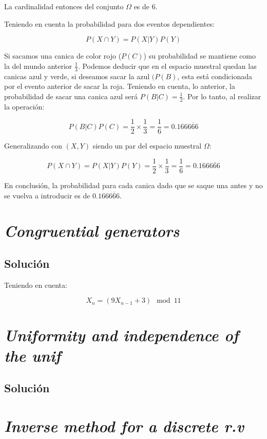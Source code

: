 \documentclass[12pt]{article}
\begin{document}
La cardinalidad entonces del conjunto \(\Omega\) es de 6.

Teniendo en cuenta la probabilidad para dos eventos dependientes:

\[
P(X \cap Y) = P(X|Y) P(Y)
\]

Si sacamos una canica de color rojo (\(P(C)\)) su probabilidad se mantiene como la del mundo anterior \(\frac{1}{3}\). Podemos deducir que en el espacio muestral quedan las canicas azul y verde, si deseamos sacar la azul \((P(B)\), esta está condicionada por el evento anterior de sacar la roja. Teniendo en cuenta, lo anterior, la probabilidad de sacar una canica azul será \(P(B|C) = \frac{1}{2}\). Por lo tanto, al realizar la operación:

\[
 P(B|C)P(C) = \frac{1}{2} \times \frac{1}{3} = \frac{1}{6} = 0.166\overline{666}
\]

Generalizando con \((X, Y)\) siendo un par del espacio muestral \(\Omega\):

\[
P(X \cap Y) = P(X|Y)P(Y) = \frac{1}{2} \times \frac{1}{3} = \frac{1}{6} =  0.166\overline{666}
\]

En conclusión, la probabilidad para cada canica dado que se saque una antes y no se vuelva a introducir es de \(0.166\overline{666}\). 

\section{\textit{Congruential generators}}
\subsection{Solución}

Teniendo en cuenta:

\[
X_{n} = (9X_{n-1} + 3) \mod 11
\]






\section{\textit{Uniformity and independence of the unif}}
\subsection{Solución}

\section{\textit{Inverse method for a discrete r.v}}
\end{document}
